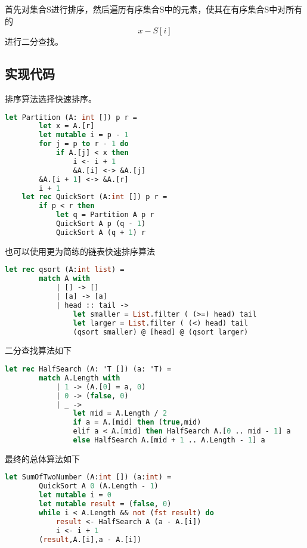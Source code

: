 \documentclass[a4paper]{article}
\begin{document}
首先对集合S进行排序，然后遍历有序集合S中的元素，使其在有序集合S中对所有的 \[ x-S[i] \] 进行二分查找。

\subsection{实现代码}

排序算法选择快速排序。

\begin{lstlisting}[language=ML]
    let Partition (A: int []) p r =
        let x = A.[r]
        let mutable i = p - 1
        for j = p to r - 1 do
            if A.[j] < x then 
                i <- i + 1
                &A.[i] <-> &A.[j]
        &A.[i + 1] <-> &A.[r]
        i + 1
    let rec QuickSort (A:int []) p r =
        if p < r then
            let q = Partition A p r
            QuickSort A p (q - 1)
            QuickSort A (q + 1) r
\end{lstlisting}

也可以使用更为简练的链表快速排序算法

\begin{lstlisting}[language=ML]
    let rec qsort (A:int list) = 
        match A with 
            | [] -> []
            | [a] -> [a]
            | head :: tail -> 
                let smaller = List.filter ( (>=) head) tail
                let larger = List.filter ( (<) head) tail
                (qsort smaller) @ [head] @ (qsort larger)
\end{lstlisting}

二分查找算法如下

\begin{lstlisting}[language=ML]
    let rec HalfSearch (A: 'T []) (a: 'T) = 
        match A.Length with
            | 1 -> (A.[0] = a, 0)
            | 0 -> (false, 0)
            | _ -> 
                let mid = A.Length / 2
                if a = A.[mid] then (true,mid)
                elif a < A.[mid] then HalfSearch A.[0 .. mid - 1] a
                else HalfSearch A.[mid + 1 .. A.Length - 1] a
\end{lstlisting}

最终的总体算法如下

\begin{lstlisting}[language=ML]
    let SumOfTwoNumber (A:int []) (a:int) =
        QuickSort A 0 (A.Length - 1)
        let mutable i = 0
        let mutable result = (false, 0)
        while i < A.Length && not (fst result) do
            result <- HalfSearch A (a - A.[i])
            i <- i + 1
        (result,A.[i],a - A.[i])
\end{lstlisting}
\end{document}
